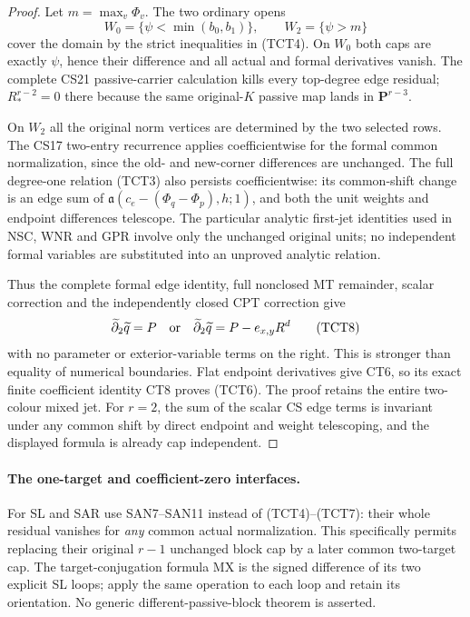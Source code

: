\begin{proof}
Let $m=\max_v\Phi_v$.  The two ordinary opens
\[
 W_0=\{\psi<\min(b_0,b_1)\},\qquad W_2=\{\psi>m\}
 \tag{TCT7}
\]
cover the domain by the strict inequalities in (TCT4).
On $W_0$ both caps are exactly $\psi$, hence their difference and
all actual and formal derivatives vanish.  The complete CS21
passive-carrier calculation kills every top-degree edge residual;
$R_*^{r-2}=0$ there because the same original-$K$ passive map
lands in $\mathbf P^{r-3}$.

On $W_2$ all the original norm vertices are determined by the two
selected rows.  The CS17 two-entry recurrence applies coefficientwise
for the formal common normalization, since the old- and new-corner
differences are unchanged.  The full degree-one relation (TCT3)
also persists coefficientwise: its common-shift change is an edge
sum of $\mathfrak a(c_e-(\Phi_q-\Phi_p),h;1)$, and both the
unit weights and endpoint differences telescope.  The particular
analytic first-jet identities used in NSC, WNR and GPR involve only
the unchanged original units; no independent formal variables
are substituted into an unproved analytic relation.

Thus the complete formal edge identity, full nonclosed MT remainder,
scalar correction and the independently closed CPT correction give
\[
 \widetilde\partial_2\widetilde q=P
 \quad\hbox{or}\quad
 \widetilde\partial_2\widetilde q=P-e_{x,y}R^d
 \tag{TCT8}
\]
with no parameter or exterior-variable terms on the right.  This
is stronger than equality of numerical boundaries.  Flat endpoint
derivatives give CT6, so its exact finite coefficient identity CT8
proves (TCT6).  The proof retains the entire two-colour mixed jet.
For $r=2$, the sum of the scalar CS edge terms is invariant under
any common shift by direct endpoint and weight telescoping, and
the displayed formula is already cap independent.
\end{proof}

\paragraph{The one-target and coefficient-zero interfaces.}
For SL and SAR use SAN7--SAN11 instead of (TCT4)--(TCT7): their
whole residual vanishes for \emph{any} common actual normalization.
This specifically permits replacing their original $r-1$ unchanged
block cap by a later common two-target cap.  The target-conjugation
formula MX is the signed difference of its two explicit SL loops;
apply the same operation to each loop and retain its orientation.
No generic different-passive-block theorem is asserted.


